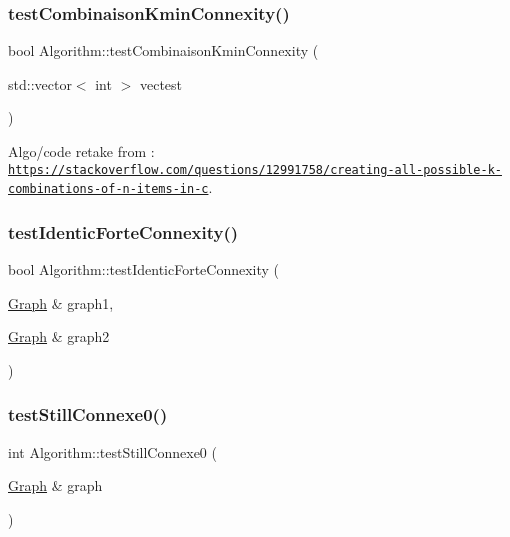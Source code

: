 \subsubsection{\texorpdfstring{test\+Combinaison\+Kmin\+Connexity()}{testCombinaisonKminConnexity()}}
{\footnotesize\ttfamily bool Algorithm\+::test\+Combinaison\+Kmin\+Connexity (\begin{DoxyParamCaption}\item[{std\+::vector$<$ int $>$}]{vectest }\end{DoxyParamCaption})}



Algo/code retake from \+: \href{https://stackoverflow.com/questions/12991758/creating-all-possible-k-combinations-of-n-items-in-c}{\tt https\+://stackoverflow.\+com/questions/12991758/creating-\/all-\/possible-\/k-\/combinations-\/of-\/n-\/items-\/in-\/c}. 

\mbox{\label{struct_algorithm_a0d7dc9d28bd602b2dbfa23bab74396c9}} 
\subsubsection{\texorpdfstring{test\+Identic\+Forte\+Connexity()}{testIdenticForteConnexity()}}
{\footnotesize\ttfamily bool Algorithm\+::test\+Identic\+Forte\+Connexity (\begin{DoxyParamCaption}\item[{\mbox{\hyperlink{class_graph}{Graph}} \&}]{graph1,  }\item[{\mbox{\hyperlink{class_graph}{Graph}} \&}]{graph2 }\end{DoxyParamCaption})}

\mbox{\label{struct_algorithm_afe508cd75cffaed44b891e17932b1ef8}} 
\subsubsection{\texorpdfstring{test\+Still\+Connexe0()}{testStillConnexe0()}}
{\footnotesize\ttfamily int Algorithm\+::test\+Still\+Connexe0 (\begin{DoxyParamCaption}\item[{\mbox{\hyperlink{class_graph}{Graph}} \&}]{graph }\end{DoxyParamCaption})}

